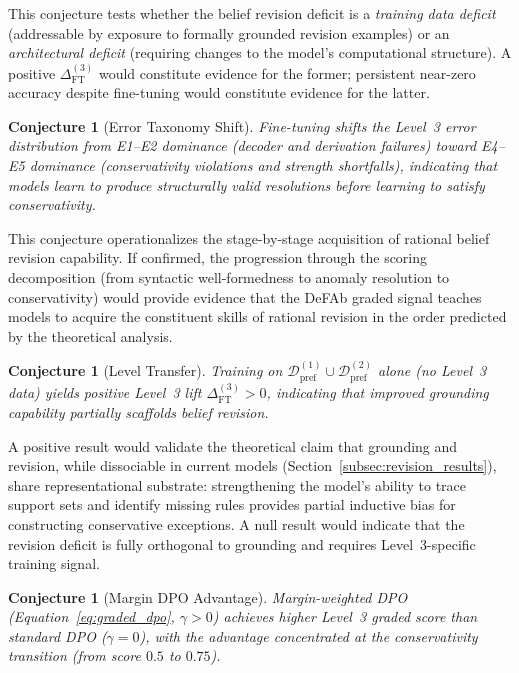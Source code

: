 \documentclass{article}
\newtheorem{conjecture}[theorem]{Conjecture}
\theoremstyle{definition}
\begin{document}
This conjecture tests whether the belief revision deficit is a \emph{training data deficit} (addressable by exposure to formally grounded revision examples) or an \emph{architectural deficit} (requiring changes to the model's computational structure). A positive $\Delta_{\mathrm{FT}}^{(3)}$ would constitute evidence for the former; persistent near-zero accuracy despite fine-tuning would constitute evidence for the latter.

\begin{conjecture}[Error Taxonomy Shift]\label{conj:errorshift}
Fine-tuning shifts the Level~3 error distribution from E1--E2 dominance (decoder and derivation failures) toward E4--E5 dominance (conservativity violations and strength shortfalls), indicating that models learn to produce structurally valid resolutions before learning to satisfy conservativity.
\end{conjecture}

This conjecture operationalizes the stage-by-stage acquisition of rational belief revision capability. If confirmed, the progression through the scoring decomposition (from syntactic well-formedness to anomaly resolution to conservativity) would provide evidence that the DeFAb graded signal teaches models to acquire the constituent skills of rational revision in the order predicted by the theoretical analysis.

\begin{conjecture}[Level Transfer]\label{conj:transfer}
Training on $\mathcal{D}_{\mathrm{pref}}^{(1)} \cup \mathcal{D}_{\mathrm{pref}}^{(2)}$ alone (no Level~3 data) yields positive Level~3 lift $\Delta_{\mathrm{FT}}^{(3)} > 0$, indicating that improved grounding capability partially scaffolds belief revision.
\end{conjecture}

A positive result would validate the theoretical claim that grounding and revision, while dissociable in current models (Section~\ref{subsec:revision_results}), share representational substrate: strengthening the model's ability to trace support sets and identify missing rules provides partial inductive bias for constructing conservative exceptions. A null result would indicate that the revision deficit is fully orthogonal to grounding and requires Level~3-specific training signal.

\begin{conjecture}[Margin DPO Advantage]\label{conj:graded}
Margin-weighted DPO (Equation~\ref{eq:graded_dpo}, $\gamma > 0$) achieves higher Level~3 graded score than standard DPO ($\gamma = 0$), with the advantage concentrated at the conservativity transition (from score $0.5$ to $0.75$).
\end{conjecture}
\end{document}

